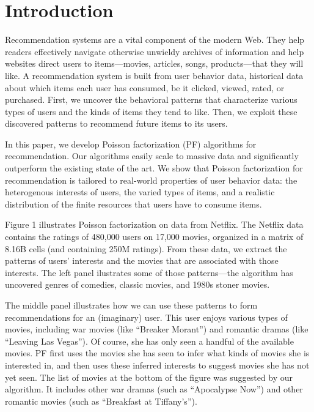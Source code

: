 \section{Introduction}

Recommendation systems are a vital component of the modern Web.  They
help readers effectively navigate otherwise unwieldy archives of
information and help websites direct users to items---movies,
articles, songs, products---that they will like.
A recommendation system is built from user behavior data, historical
data about which items each user has consumed, be it clicked, viewed,
rated, or purchased. First, we uncover the behavioral patterns that
characterize various types of users and the kinds of items they tend
to like.  Then, we exploit these discovered patterns to recommend
future items to its users.

In this paper, we develop Poisson factorization (PF) algorithms for
recommendation.  Our algorithms easily scale to massive data and
significantly outperform the existing state of the art.  We show that
Poisson factorization for recommendation is tailored to real-world
properties of user behavior data: the heterogenous interests of users,
the varied types of items, and a realistic distribution of the finite
resources that users have to consume items.

Figure 1 illustrates Poisson factorization on data from Netflix.  The
Netflix data contains the ratings of 480,000 users on 17,000 movies,
organized in a matrix of 8.16B cells (and containing 250M ratings).
From these data, we extract the patterns of users' interests and the
movies that are associated with those interests.  The left panel
ilustrates some of those patterns---the algorithm has uncovered genres
of comedies, classic movies, and 1980s stoner movies.

The middle panel illustrates how we can use these patterns to form
recommendations for an (imaginary) user.  This user enjoys various
types of movies, including war movies (like ``Breaker Morant'') and
romantic dramas (like ``Leaving Las Vegas'').  Of course, she has only
seen a handful of the available movies.  PF first uses the movies she
has seen to infer what kinds of movies she is interested in, and then
uses these inferred interests to suggest movies she has not yet seen.
The list of movies at the bottom of the figure was suggested by our
algorithm. It includes other war dramas (such as ``Apocalypse Now'')
and other romantic movies (such as ``Breakfast at Tiffany's'').

